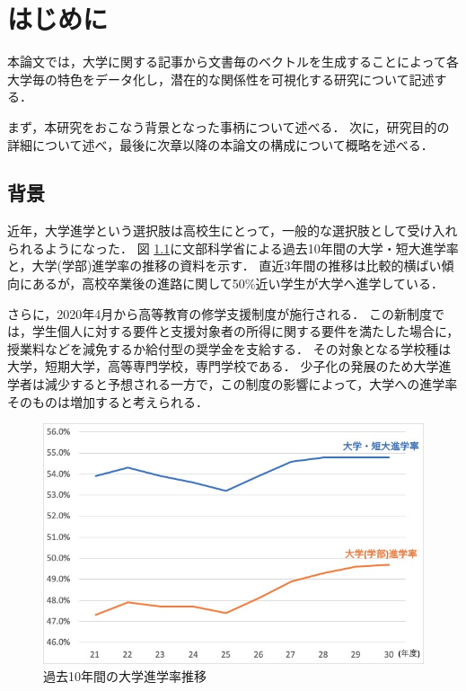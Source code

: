 \chapter{はじめに}
本論文では，大学に関する記事から文書毎のベクトルを生成することによって各大学毎の特色をデータ化し，潜在的な関係性を可視化する研究について記述する．

まず，本研究をおこなう背景となった事柄について述べる．
次に，研究目的の詳細について述べ，最後に次章以降の本論文の構成について概略を述べる．

\section{背景}
近年，大学進学という選択肢は高校生にとって，一般的な選択肢として受け入れられるようになった．
図 \ref{fig:univ_continuance_rate}に文部科学省による過去10年間の大学・短大進学率と，大学(学部)進学率の推移の資料\cite{univContinuanceRate}を示す．  
直近3年間の推移は比較的横ばい傾向にあるが，高校卒業後の進路に関して50\%近い学生が大学へ進学している．

さらに，2020年4月から高等教育の修学支援制度\cite{Shingakusyusienseido}が施行される．
この新制度では，学生個人に対する要件と支援対象者の所得に関する要件を満たした場合に，授業料などを減免するか給付型の奨学金を支給する．
その対象となる学校種は大学，短期大学，高等専門学校，専門学校である．
少子化の発展のため大学進学者は減少すると予想される一方で，この制度の影響によって，大学への進学率そのものは増加すると考えられる．
\begin{figure}[H]
\centering
\includegraphics[scale=0.63]{images/univ_continuance_rate.jpg}
\caption{過去10年間の大学進学率推移}
\label{fig:univ_continuance_rate}
\end{figure}

